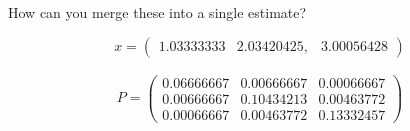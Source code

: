How can you merge these into a single estimate?

\begin{Shaded}
\begin{Highlighting}[]

\OperatorTok{=} \NormalTok{[}\OperatorTok{,}\OperatorTok{,}\NormalTok{]}
\OperatorTok{=} \NormalTok{[}\OperatorTok{,} \OperatorTok{,}\NormalTok{]}
\OperatorTok{=} \NormalTok{[}  \OperatorTok{;}   \OperatorTok{;}   \NormalTok{]}
\OperatorTok{=} \NormalTok{[}  \OperatorTok{;}   \OperatorTok{;}   \NormalTok{]}

\OperatorTok{=}
\OperatorTok{=}
\OperatorTok{=}\OperatorTok{{-}}
\OperatorTok{=}\OperatorTok{+}
\OperatorTok{=}\OperatorTok{*}
\OperatorTok{=}\OperatorTok{+}\OperatorTok{*}
\OperatorTok{=}\OperatorTok{{-}}\OperatorTok{*}
\OperatorTok{,}\OperatorTok{,} \OperatorTok{,}
\end{Highlighting}
\end{Shaded}

\[x = \begin{pmatrix} 1.03333333&  2.03420425,& 3.00056428\end{pmatrix}\]

\[\begin{aligned}
P = \begin{pmatrix}
0.06666667& 0.00666667&  0.00066667\\
0.00666667& 0.10434213&  0.00463772 \\
0.00066667&  0.00463772&  0.13332457
\end{pmatrix}
\end{aligned}\]

